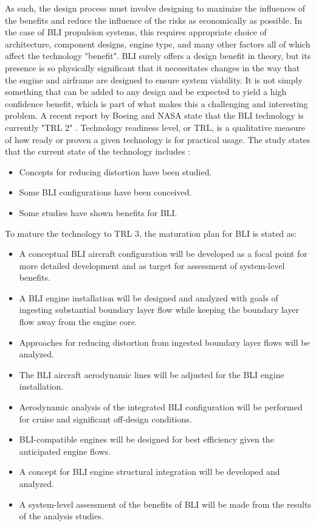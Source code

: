 \indent As such, the design process must involve designing to maximize the influences of the benefits and reduce the influence of the risks as economically as possible. In the case of BLI propulsion systems, this requires appropriate choice of architecture, component designs, engine type, and many other factors all of which affect the technology "benefit". BLI surely offers a design benefit in theory, but its presence is so physically significant that it necessitates changes in the way that the engine and airframe are designed to ensure system viability. It is not simply something that can be added to any design and be expected to yield a high confidence benefit, which is part of what makes this a challenging and interesting problem.
\indent A recent report by Boeing and NASA state that the BLI technology is currently "TRL 2" \cite{Bradley2012}.  Technology readiness level, or TRL, is a qualitative measure of how ready or proven a given technology is for practical usage.  The study states that the current state of the technology includes \cite{Bradley2012}:
\begin{itemize}
\item{Concepts for reducing distortion have been studied.}
\item{Some BLI configurations have been conceived.}
\item{Some studies have shown benefits for BLI.}
\end{itemize}

To mature the technology to TRL 3, the maturation plan for BLI is stated as:

\begin{itemize}
\item{A conceptual BLI aircraft configuration will be developed as a focal point for more detailed
development and as target for assessment of system-level benefits.}
\item{A BLI engine installation will be designed and analyzed with goals of ingesting substantial
boundary layer flow while keeping the boundary layer flow away from the engine core.}
\item{Approaches for reducing distortion from ingested boundary layer flows will be analyzed.}
\item{The BLI aircraft aerodynamic lines will be adjusted for the BLI engine installation.}
\item{Aerodynamic analysis of the integrated BLI configuration will be performed for cruise and
significant off-design conditions.}
\item{BLI-compatible engines will be designed for best efficiency given the anticipated engine flows.}
\item{A concept for BLI engine structural integration will be developed and analyzed.}
\item{A system-level assessment of the benefits of BLI will be made from the results of the analysis
studies.}
\end{itemize}

